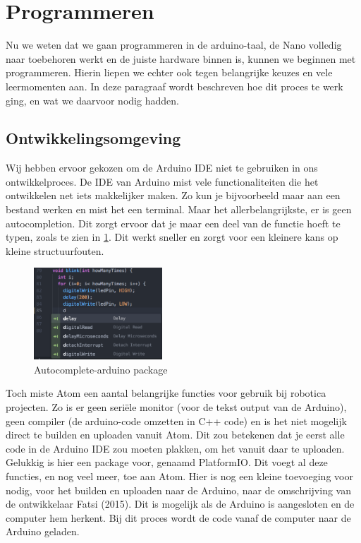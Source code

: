 \hypertarget{programmeren}{%
\section{Programmeren}\label{programmeren}}

Nu we weten dat we gaan programmeren in de arduino-taal, de Nano
volledig naar toebehoren werkt en de juiste hardware binnen is, kunnen
we beginnen met programmeren. Hierin liepen we echter ook tegen
belangrijke keuzes en vele leermomenten aan. In deze paragraaf wordt
beschreven hoe dit proces te werk ging, en wat we daarvoor nodig hadden.

\hypertarget{ontwikkelingsomgeving}{%
\subsection{Ontwikkelingsomgeving}\label{ontwikkelingsomgeving}}

Wij hebben ervoor gekozen om de Arduino IDE niet te gebruiken in ons
ontwikkelproces. De IDE van Arduino mist vele functionaliteiten die het
ontwikkelen net iets makkelijker maken. Zo kun je bijvoorbeeld maar aan
een bestand werken en mist het een terminal. Maar het
allerbelangrijkste, er is geen autocompletion. Dit zorgt ervoor dat je
maar een deel van de functie hoeft te typen, zoals te zien in
\cref{fig:autocomplete}. Dit werkt sneller en zorgt voor
een kleinere kans op kleine structuurfouten.

\begin{figure}
\centering
\includegraphics[width=0.43\textwidth,height=\textheight]{img/image_25.png}
\caption{Autocomplete-arduino package\label{fig:autocomplete}}
\end{figure}

Toch miste Atom een aantal belangrijke functies voor gebruik bij
robotica projecten. Zo is er geen seriële monitor (voor de tekst output
van de Arduino), geen compiler (de arduino-code omzetten in C++ code) en
is het niet mogelijk direct te builden en uploaden vanuit Atom. Dit zou
betekenen dat je eerst alle code in de Arduino IDE zou moeten plakken,
om het vanuit daar te uploaden. Gelukkig is hier een package voor,
genaamd PlatformIO. Dit voegt al deze functies, en nog veel meer, toe
aan Atom. Hier is nog een kleine toevoeging voor nodig, voor het builden
en uploaden naar de Arduino, naar de omschrijving van de ontwikkelaar
Fatsi (2015). Dit is mogelijk als de Arduino is aangesloten en de
computer hem herkent. Bij dit proces wordt de code vanaf de computer
naar de Arduino geladen.

